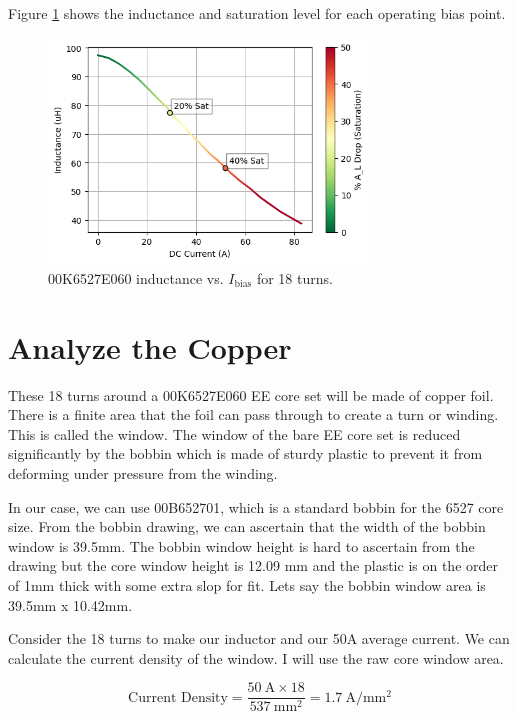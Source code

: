 \documentclass{article}
\begin{document}
Figure \ref{fig:inductance_vs_dc} shows the inductance and saturation level for each operating bias point.

\begin{figure}[H]
    \centering
    \includegraphics[height=6cm]{inductance_vs_dc_wsat_notitle.png}
    \caption{00K6527E060 inductance vs. $I_\text{bias}$ for 18 turns.}
    \label{fig:inductance_vs_dc}
\end{figure}

\section{Analyze the Copper}
These 18 turns around a 00K6527E060 EE core set will be made of copper foil.  There is a finite area that the foil can pass through to create a turn or winding.  This is called the window.  The window of the bare EE core set is reduced significantly by the bobbin which is made of sturdy plastic to prevent it from deforming under pressure from the winding.

In our case, we can use 00B652701, which is a standard bobbin for the 6527 core size.  From the bobbin drawing, we can ascertain that the width of the bobbin window is 39.5mm.  The bobbin window height is hard to ascertain from the drawing but the core window height is 12.09 mm and the plastic is on the order of 1mm thick with some extra slop for fit.  Lets say the bobbin window area is 39.5mm x 10.42mm.

Consider the 18 turns to make our inductor and our 50A average current.  We can calculate the current density of the window.  I will use the raw core window area.

\begin{equation}
    \text{Current Density} = \frac{\SI{50}{\ampere} \times \num{18}}{\SI{537}{\milli\meter\squared}} = \SI{1.7}{\ampere\per\milli\meter^2}
\end{equation}
\end{document}
